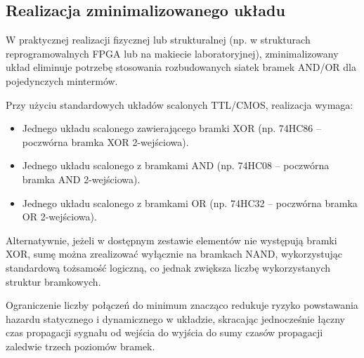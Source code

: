 \subsection{Realizacja zminimalizowanego układu}

W praktycznej realizacji fizycznej lub strukturalnej (np. w strukturach reprogramowalnych FPGA lub na makiecie laboratoryjnej), zminimalizowany układ eliminuje potrzebę stosowania rozbudowanych siatek bramek AND/OR dla pojedynczych mintermów.

Przy użyciu standardowych układów scalonych TTL/CMOS, realizacja wymaga:

\begin{itemize}
    \item Jednego układu scalonego zawierającego bramki XOR (np. 74HC86 -- poczwórna bramka XOR 2-wejściowa).
    \item Jednego układu scalonego z bramkami AND (np. 74HC08 -- poczwórna bramka AND 2-wejściowa).
    \item Jednego układu scalonego z bramkami OR (np. 74HC32 -- poczwórna bramka OR 2-wejściowa).
\end{itemize}

Alternatywnie, jeżeli w dostępnym zestawie elementów nie występują bramki XOR, sumę można zrealizować wyłącznie na bramkach NAND, wykorzystując standardową tożsamość logiczną, co jednak zwiększa liczbę wykorzystanych struktur bramkowych.

Ograniczenie liczby połączeń do minimum znacząco redukuje ryzyko powstawania hazardu statycznego i dynamicznego w układzie, skracając jednocześnie łączny czas propagacji sygnału od wejścia do wyjścia do sumy czasów propagacji zaledwie trzech poziomów bramek.
